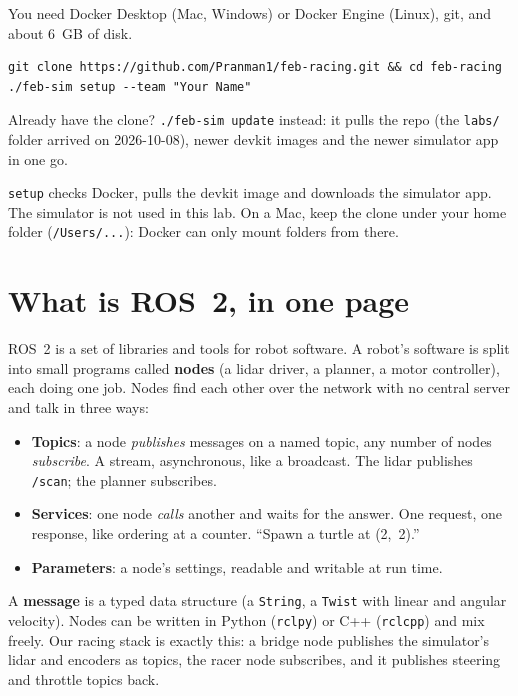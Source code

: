 \documentclass[11pt,a4paper]{article}
\begin{document}
You need Docker Desktop (Mac, Windows) or Docker Engine (Linux), git, and about 6~GB of disk.

\begin{lstlisting}
git clone https://github.com/Pranman1/feb-racing.git && cd feb-racing
./feb-sim setup --team "Your Name"
\end{lstlisting}

Already have the clone? \texttt{./feb-sim update} instead: it pulls the repo (the \texttt{labs/}
folder arrived on 2026-10-08), newer devkit images and the newer simulator app in one go.

\texttt{setup} checks Docker, pulls the devkit image and downloads the simulator app. The
simulator is not used in this lab. On a Mac, keep the clone under your home folder
(\texttt{/Users/...}): Docker can only mount folders from there.

\section{What is ROS~2, in one page}

ROS~2 is a set of libraries and tools for robot software. A robot's software is split into small
programs called \textbf{nodes} (a lidar driver, a planner, a motor controller), each doing one
job. Nodes find each other over the network with no central server and talk in three ways:

\begin{itemize}
  \item \textbf{Topics}: a node \emph{publishes} messages on a named topic, any number of nodes
  \emph{subscribe}. A stream, asynchronous, like a broadcast. The lidar publishes \texttt{/scan};
  the planner subscribes.
  \item \textbf{Services}: one node \emph{calls} another and waits for the answer. One request, one
  response, like ordering at a counter. ``Spawn a turtle at (2,~2).''
  \item \textbf{Parameters}: a node's settings, readable and writable at run time.
\end{itemize}

A \textbf{message} is a typed data structure (a \texttt{String}, a \texttt{Twist} with linear and
angular velocity). Nodes can be written in Python (\texttt{rclpy}) or C++ (\texttt{rclcpp}) and
mix freely. Our racing stack is exactly this: a bridge node publishes the simulator's lidar and
encoders as topics, the racer node subscribes, and it publishes steering and throttle topics
back.
\end{document}
